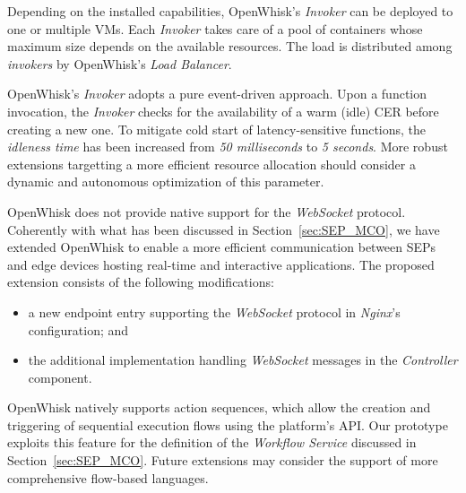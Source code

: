 

Depending on the installed capabilities, OpenWhisk's \textit{Invoker} can be deployed to one or multiple VMs. Each \textit{Invoker} takes care of a pool of containers whose maximum size depends on the available resources. The load is distributed among \textit{invokers} by OpenWhisk's \textit{Load Balancer}.

OpenWhisk's \textit{Invoker} adopts a pure event-driven approach. Upon a function invocation, the \textit{Invoker} checks for the availability of a warm (idle) CER before creating a new one. To mitigate cold start of latency-sensitive functions, the \textit{idleness time} has been increased from \textit{50 milliseconds} to \textit{5 seconds}. More robust extensions targetting a more efficient resource allocation should consider a dynamic and autonomous optimization of this parameter.

OpenWhisk does not provide native support for the \textit{WebSocket} protocol. Coherently with what has been discussed in Section~\ref{sec:SEP_MCO}, we have extended OpenWhisk to enable a more efficient communication between SEPs and edge devices hosting real-time and interactive applications. The proposed extension consists of the following modifications: 

\begin{itemize}
    
    \item a new endpoint entry supporting the \textit{WebSocket} protocol in \textit{Nginx}'s configuration; and
    
    \item the additional implementation handling \textit{WebSocket} messages in the \textit{Controller} component.
    
\end{itemize}


OpenWhisk natively supports action sequences, which allow the creation and triggering of sequential execution flows using the platform's API. Our prototype exploits this feature for the definition of the \textit{Workflow Service} discussed in Section~\ref{sec:SEP_MCO}. Future extensions may consider the support of more comprehensive flow-based languages. %


